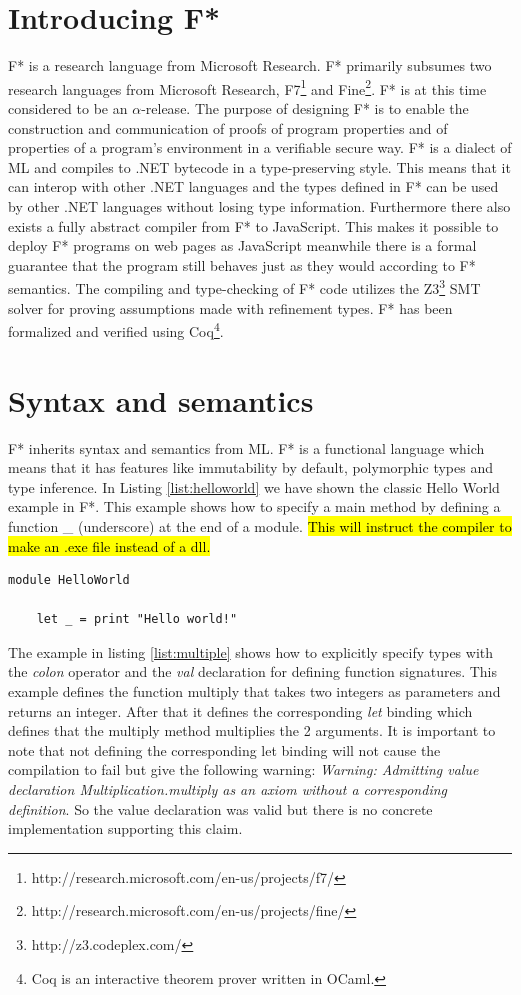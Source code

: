 \documentclass[twosided]{report}
\begin{document}
\section{Introducing F*}
F* is a research language from Microsoft Research. F* primarily subsumes two research languages from Microsoft Research, F7\footnote{http://research.microsoft.com/en-us/projects/f7/} and Fine\footnote{http://research.microsoft.com/en-us/projects/fine/}. F* is at this time considered to be an $\alpha$-release. The purpose of designing F* is to enable the construction and communication of proofs of program properties and of properties of a program's environment in a verifiable secure way. F* is a dialect of ML and compiles to .NET bytecode in a type-preserving style. This means that it can interop with other .NET languages and the types defined in F* can be used by other .NET languages without losing type information. Furthermore there also exists a fully abstract compiler from F* to JavaScript. This makes it possible to deploy F* programs on web pages as JavaScript meanwhile there is a formal guarantee that the program still behaves just as they would according to F* semantics. The compiling and type-checking of F* code utilizes the Z3\footnote{http://z3.codeplex.com/} SMT solver for proving assumptions made with refinement types. F* has been formalized and verified using Coq\footnote{Coq is an interactive theorem prover written in OCaml.}.

\section{Syntax and semantics}
F* inherits syntax and semantics from ML. F* is a functional language which means that it has features like immutability by default, polymorphic types and type inference. In Listing \ref{list:helloworld} we have shown the classic Hello World example in F*. This example shows how to specify a main method by defining a function \_ (underscore) at the end of a module. \hl{This will instruct the compiler to make an .exe file instead of a dll.}

\begin{lstlisting}[style=fstar, caption={Hello World example in F*}, label={list:helloworld}]
	module HelloWorld
	
	let _ = print "Hello world!"
\end{lstlisting}

The example in listing \ref{list:multiple} shows how to explicitly specify types with the \emph{colon} operator and the \emph{val} declaration for defining function signatures. This example defines the function multiply that takes two integers as parameters and returns an integer. After that it defines the corresponding \emph{let} binding which defines that the multiply method multiplies the 2 arguments. It is important to note that not defining the corresponding let binding will not cause the compilation to fail but give the following warning: \emph{Warning: Admitting value declaration Multiplication.multiply as an axiom without a corresponding definition}. So the value declaration was valid but there is no concrete implementation supporting this claim.
\end{document}
